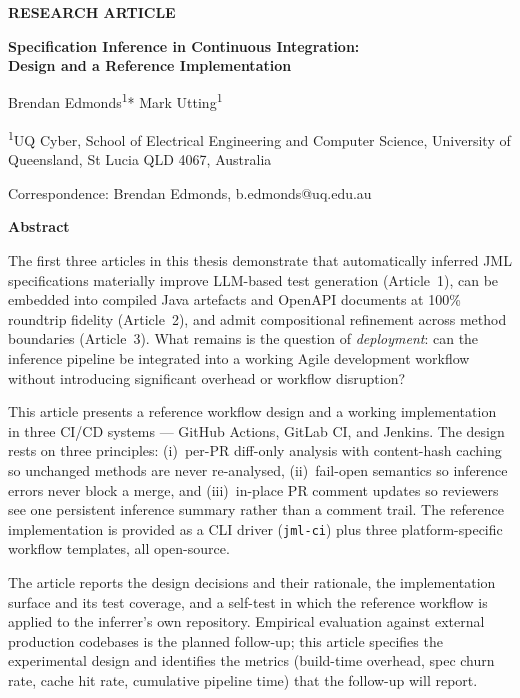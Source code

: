 \documentclass[11pt]{article}
\begin{document}
\linenumbers

\noindent\textbf{RESEARCH ARTICLE}
\vspace{1em}

\begin{center}
{\LARGE\bfseries Specification Inference in Continuous Integration:\\Design and a Reference Implementation}
\vspace{1.5em}

{\large Brendan Edmonds\textsuperscript{1}* \quad Mark Utting\textsuperscript{1}}
\vspace{0.5em}

{\small\textsuperscript{1}UQ Cyber, School of Electrical Engineering and Computer Science, University of Queensland, St Lucia QLD 4067, Australia}
\vspace{0.5em}

{\small *Correspondence: Brendan Edmonds, b.edmonds@uq.edu.au}
\end{center}

\vspace{1em}

\noindent\textbf{Abstract}
\vspace{0.5em}

\noindent The first three articles in this thesis demonstrate that automatically inferred JML specifications materially improve LLM-based test generation (Article~1), can be embedded into compiled Java artefacts and OpenAPI documents at 100\% roundtrip fidelity (Article~2), and admit compositional refinement across method boundaries (Article~3). What remains is the question of \emph{deployment}: can the inference pipeline be integrated into a working Agile development workflow without introducing significant overhead or workflow disruption?

This article presents a reference workflow design and a working implementation in three CI/CD systems --- GitHub Actions, GitLab CI, and Jenkins. The design rests on three principles: (i)~per-PR diff-only analysis with content-hash caching so unchanged methods are never re-analysed, (ii)~fail-open semantics so inference errors never block a merge, and (iii)~in-place PR comment updates so reviewers see one persistent inference summary rather than a comment trail. The reference implementation is provided as a CLI driver (\texttt{jml-ci}) plus three platform-specific workflow templates, all open-source.

The article reports the design decisions and their rationale, the implementation surface and its test coverage, and a self-test in which the reference workflow is applied to the inferrer's own repository. Empirical evaluation against external production codebases is the planned follow-up; this article specifies the experimental design and identifies the metrics (build-time overhead, spec churn rate, cache hit rate, cumulative pipeline time) that the follow-up will report.
\end{document}
